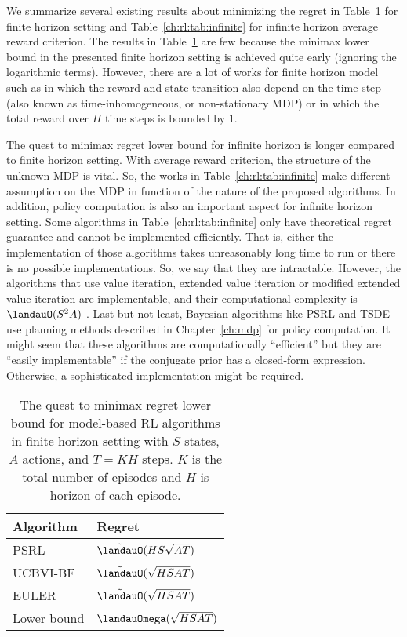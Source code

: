 We summarize several existing results about minimizing the regret in Table~\ref{ch:rl:tab:finite} for finite horizon setting and Table~\ref{ch:rl:tab:infinite} for infinite horizon average reward criterion.
The results in Table~\ref{ch:rl:tab:finite} are few because the minimax lower bound in the presented finite horizon setting is achieved quite early (ignoring the logarithmic terms).
However, there are a lot of works for finite horizon model such as  \cite{jin2018q, domingues2021episodic, li2021breaking} in which the reward and state transition also depend on the time step (also known as time-inhomogeneous, or non-stationary MDP) or \cite{zanette2019tighter, zhang2021reinforcement} in which the total reward over $H$ time steps is bounded by $1$.

The quest to minimax regret lower bound for infinite horizon is longer compared to finite horizon setting.
With average reward criterion, the structure of the unknown MDP is vital.
So, the works in Table~\ref{ch:rl:tab:infinite} make different assumption on the MDP in function of the nature of the proposed algorithms.
In addition, policy computation is also an important aspect for infinite horizon setting.
Some algorithms in Table~\ref{ch:rl:tab:infinite} only have theoretical regret guarantee and cannot be implemented efficiently.
That is, either the implementation of those algorithms takes unreasonably long time to run or there is no possible implementations.
So, we say that they are intractable.
However, the algorithms that use value iteration, extended value iteration or modified extended value iteration are implementable, and their computational complexity is $\landauO(S^2A)$ \cite{jaksch2010near}.
Last but not least, Bayesian algorithms like PSRL and TSDE use planning methods described in Chapter~\ref{ch:mdp} for policy computation.
It might seem that these algorithms are computationally ``efficient'' but they are ``easily implementable'' if the conjugate prior has a closed-form expression.
Otherwise, a sophisticated implementation might be required.

\begin{table}[ht]
    \centering
\begin{tabular}{|l|l|}
\hline
Algorithm & Regret \\ \hline
PSRL \cite{osband2013more}  & $\tilde{\landauO}(HS\sqrt{AT})$ \\ 
UCBVI-BF \cite{azar2017minimax}  & $\tilde{\landauO}(\sqrt{HSAT})$ \\ 
EULER \cite{zanette2019tighter}        & $\tilde{\landauO}(\sqrt{HSAT})$ \\ \hline
Lower bound & $\landauOmega(\sqrt{HSAT})$ \cite{jaksch2010near} \\ \hline
\end{tabular}
\caption{The quest to minimax regret lower bound for model-based RL algorithms in finite horizon setting with $S$ states, $A$ actions, and $T=KH$ steps.
$K$ is the total number of episodes and $H$ is horizon of each episode.
}
\label{ch:rl:tab:finite}
\end{table}

